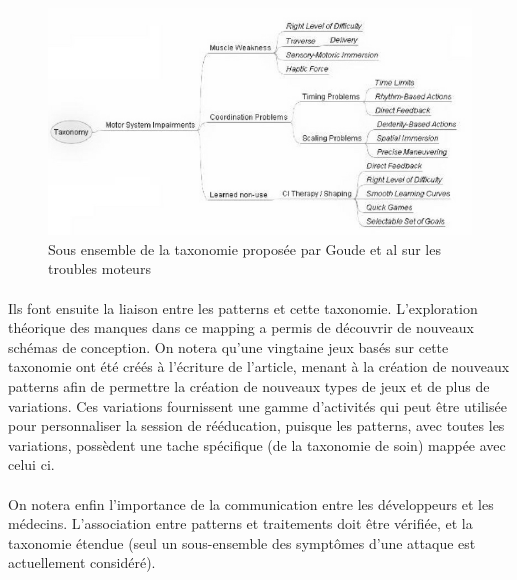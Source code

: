 \begin{figure}
	\centering
	\includegraphics[width=15cm]{images/taxonomy_conception.png}
	\caption{Sous ensemble de la taxonomie proposée par Goude et al\cite{Goud07} sur les troubles moteurs}
	\label{taxonomy_conception}
\end{figure}

\paragraph{}Ils font ensuite la liaison entre les patterns et cette taxonomie. L'exploration théorique des manques dans ce mapping a permis de découvrir de
nouveaux schémas de conception. On notera qu'une vingtaine jeux basés sur cette taxonomie ont été créés à l'écriture de l'article, menant à la création de nouveaux patterns afin de permettre la création de nouveaux types de jeux et de plus de variations. Ces variations fournissent une gamme d'activités qui peut être utilisée pour personnaliser la session de rééducation, puisque les patterns, avec toutes les variations, possèdent une tache spécifique (de la taxonomie de soin) mappée avec celui ci.

\paragraph{}On notera enfin l'importance de la communication entre les développeurs et les médecins. L'association entre patterns et traitements doit être vérifiée, et la taxonomie étendue (seul un sous-ensemble des symptômes d'une attaque est actuellement considéré).
